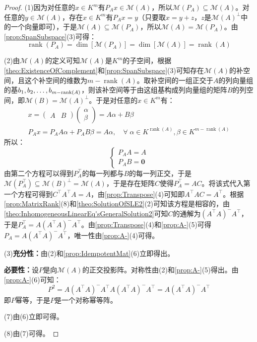 \begin{proof}
	(1)因为对任意的$x\in K^m$有$P_Ax\in\mathcal{M}(A)$，所以$\mathcal{M}(P_A)\subseteq\mathcal{M}(A)$。对任意的$y\in\mathcal{M}(A)$，存在$x\in K^m$有$P_Ax=y$（只要取$x=y+z$，$z$是$\mathcal{M}(A)^\perp$中的一个向量即可），于是$\mathcal{M}(A)\subseteq\mathcal{M}(P_A)$，所以$\mathcal{M}(A)=\mathcal{M}(P_A)$。由\cref{prop:SpanSubspace}(3)可得：
	\begin{equation*}
		\operatorname{rank}(P_A)=\dim[\mathcal{M}(P_A)]=\dim[\mathcal{M}(A)]=\operatorname{rank}(A)
	\end{equation*}\par
	(2)由$\mathcal{M}(A)$的定义可知$\mathcal{M}(A)$是$K^m$的子空间，根据\cref{theo:ExistenceOfComplement}和\cref{prop:SpanSubspace}(3)可知存在$\mathcal{M}(A)$的补空间，且这个补空间的维数为$m-\operatorname{rank}(A)$。取补空间的一组正交于$A$的列向量组的基$b_1, b_2, \dots, b_{m-\operatorname{rank}(A)}$，则该补空间等于由这组基构成列向量组的矩阵$B$的列空间，即$\mathcal{M}(B)=\mathcal{M}(A)^\perp$。于是对任意的$x\in K^m$有：
	\begin{gather*}
		x=
		\begin{pmatrix}
			A & B
		\end{pmatrix}
		\begin{pmatrix}
			\alpha \\
			\beta
		\end{pmatrix}=A\alpha+B\beta \\
		P_Ax=P_AA\alpha+P_AB\beta=A\alpha,\quad\forall\;\alpha\in K^{\operatorname{rank}(A)},\beta\in K^{m-\operatorname{rank}(A)}
	\end{gather*}
	所以：
	\begin{equation*}
		\begin{cases}
			P_AA=A \\
			P_AB=\mathbf{0}
		\end{cases}
	\end{equation*}
	由第二个方程可以得到$P_A^{\top}$的每一列都与$B$的每一列正交，于是$\mathcal{M}(P_A^{\top})\subseteq\mathcal{M}(B)^\perp=\mathcal{M}(A)$，于是存在矩阵$C$使得$P_A^{\top}=AC$。将该式代入第一个方程可得到$C^{\top}A^{\top}A=A$，由\cref{prop:Transpose}(4)可知即$A^{\top}AC=A^{\top}$。根据\cref{prop:MatrixRank}(8)和\cref{theo:SolutionOfSLE2}(2)可知该方程是相容的，由\cref{theo:InhomogeneousLinearEq'sGeneralSolution2}可知$C$的通解为$(A^{\top}A)^-A^{\top}$，于是$P_A^{\top}=A(A^{\top}A)^-A^{\top}$。由\cref{prop:Transpose}(4)和\cref{prop:A-}(5)可得$P_A=A(A^{\top}A)^-A^{\top}$，唯一性由\cref{prop:A-}(4)可得。\par
	(3)\textbf{充分性：}由(2)和\cref{prop:IdempotentMat}(6)立即得出。\par
	\textbf{必要性：}设$P$是向$\mathcal{M}(A)$的正交投影阵。对称性由(2)和\cref{prop:A-}(5)得出。由\cref{prop:A-}(6)可知：
	\begin{equation*}
		P^2=A(A^{\top}A)^-A^{\top}A(A^{\top}A)^-A^{\top}=A(A^{\top}A)^-A^{\top}
	\end{equation*}
	即$P$幂等，于是$P$是一个对称幂等阵。\par
	(7)由(6)立即可得。\par
	(8)由(7)可得。
\end{proof}

